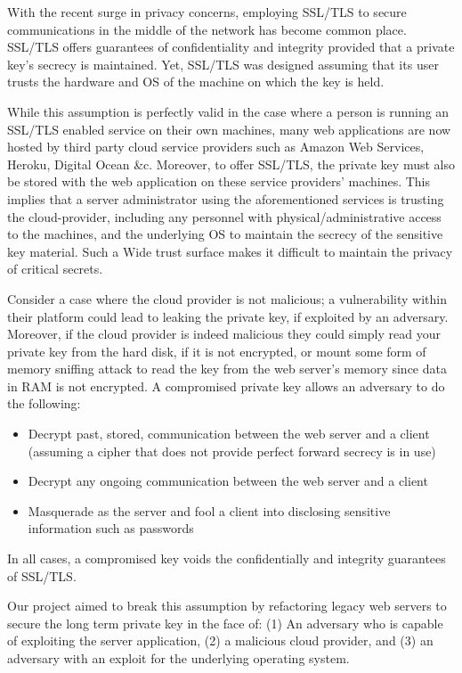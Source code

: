 \documentclass[../main.tex]{subfiles}
\begin{document}
With the recent surge in privacy concerns, employing SSL/TLS to secure
communications in the middle of the network has become common place. SSL/TLS
offers guarantees of confidentiality and integrity provided that a private 
key's secrecy is maintained. Yet, SSL/TLS was designed assuming that its 
user trusts the hardware and OS of the machine on which the key is held. 
 
While this assumption is perfectly valid in the case where a person is running
an SSL/TLS enabled service on their own machines, many web applications are now
hosted by third party cloud service providers such as Amazon Web Services, 
Heroku, Digital Ocean \&c. Moreover, to offer SSL/TLS, the private key must 
also be stored with the web application on these service providers' machines.
This implies that a server administrator using the aforementioned services is
trusting the cloud-provider, including any personnel with
physical/administrative access to the machines, and the underlying OS to 
maintain the secrecy of the sensitive key material. Such a Wide trust surface 
makes it difficult to maintain the privacy of critical secrets.

Consider a case where the cloud provider is not malicious; a vulnerability 
within their platform could lead to leaking the private key, if exploited by an
adversary. Moreover, if the cloud provider is indeed malicious they could simply
read your private key from the hard disk, if it is not encrypted, or mount some
form of memory sniffing attack to read the key from the web server's memory
since data in RAM is not encrypted. A compromised private key allows an 
adversary to do the following:
\begin{itemize}
	\item Decrypt past, stored, communication between the web server and a 
	client (assuming a cipher that does not provide perfect forward secrecy is 
	in use)
	\item Decrypt any ongoing communication between the web server and a client
	\item Masquerade as the server and fool a client into disclosing sensitive 
	information such as passwords
\end{itemize}
In all cases, a compromised key voids the confidentially and integrity 
guarantees of SSL/TLS. 

Our project aimed to break this assumption by refactoring legacy web servers to 
secure the long term private key in the face of: (1) An adversary who is capable 
of exploiting the server application, (2) a malicious cloud provider, and (3) 
an adversary with an exploit for the underlying operating system. 
\end{document}

